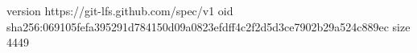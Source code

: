 version https://git-lfs.github.com/spec/v1
oid sha256:069105fefa395291d784150d09a0823efdff4c2f2d5d3ce7902b29a524c889ec
size 4449

